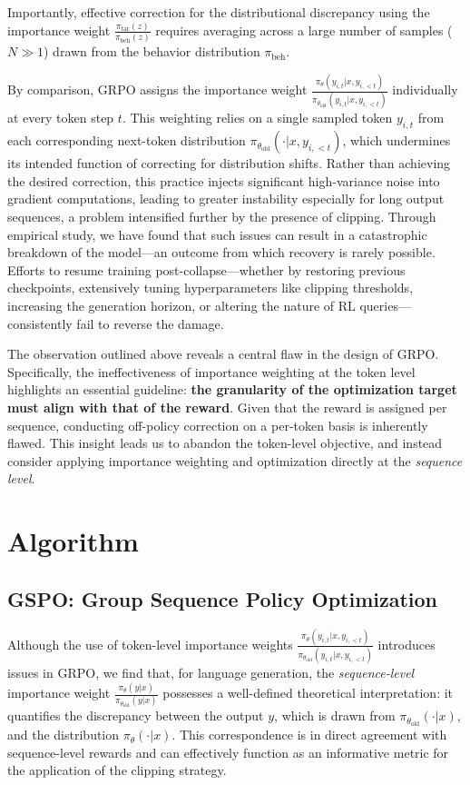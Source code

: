 Importantly, effective correction for the distributional discrepancy using the importance weight $\frac{ \pi_\text{tar} (z) }{ \pi_\text{beh} (z)}$ requires averaging across a large number of samples ($N \gg 1$) drawn from the behavior distribution $\pi_\text{beh}$.

By comparison, GRPO assigns the importance weight $\frac{ \pi_{\theta} (y_{i,t} | x, y_{i,<t}) }{ \pi_{\theta_\text{old}} (y_{i,t} | x,y_{i,<t})}$ individually at every token step $t$. This weighting relies on a single sampled token $y_{i,t}$ from each corresponding next-token distribution $\pi_{\theta_\text{old}}( \cdot | x, y_{i, <t})$, which undermines its intended function of correcting for distribution shifts. Rather than achieving the desired correction, this practice injects significant high-variance noise into gradient computations, leading to greater instability especially for long output sequences, a problem intensified further by the presence of clipping. Through empirical study, we have found that such issues can result in a catastrophic breakdown of the model—an outcome from which recovery is rarely possible. Efforts to resume training post-collapse—whether by restoring previous checkpoints, extensively tuning hyperparameters like clipping thresholds, increasing the generation horizon, or altering the nature of RL queries—consistently fail to reverse the damage.

The observation outlined above reveals a central flaw in the design of GRPO. Specifically, the ineffectiveness of importance weighting at the token level highlights an essential guideline: \textbf{the granularity of the optimization target must align with that of the reward}. Given that the reward is assigned per sequence, conducting off-policy correction on a per-token basis is inherently flawed. This insight leads us to abandon the token-level objective, and instead consider applying importance weighting and optimization directly at the \textit{sequence level}.

\section{Algorithm}

\subsection{GSPO: Group Sequence Policy Optimization}

Although the use of token-level importance weights $\frac{ \pi_{\theta} (y_{i,t} | x, y_{i,<t}) }{ \pi_{\theta_\text{old}} (y_{i,t} | x,y_{i,<t})}$ introduces issues in GRPO, we find that, for language generation, the \textit{sequence-level} importance weight $\frac{ \pi_{\theta} (y | x) }{ \pi_{\theta_\text{old}} (y | x)}$ possesses a well-defined theoretical interpretation: it quantifies the discrepancy between the output $y$, which is drawn from $\pi_{\theta_\text{old}} (\cdot | x)$, and the distribution $\pi_{\theta} (\cdot | x)$. This correspondence is in direct agreement with sequence-level rewards and can effectively function as an informative metric for the application of the clipping strategy.

